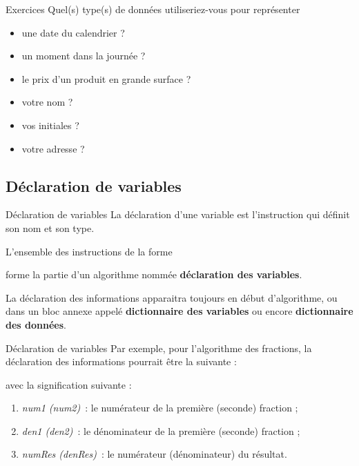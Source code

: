 \begin{frame}{Exercices}
	Quel(s) type(s) de données utiliseriez-vous 
	pour représenter 
	\begin{itemize}
		\item une date du calendrier ?
		\item un moment dans la journée ?
		\item le prix d'un produit en grande surface ?
		\item votre nom ?
		\item vos initiales ?
		\item votre adresse ?
	\end{itemize}	
\end{frame}

\subsection{Déclaration de variables}

\begin{frame}{Déclaration de variables}
	La déclaration d’une variable est l’instruction 
	qui définit son nom et son type.
	
	\bigskip
	
	L’ensemble des instructions de la forme


	forme la partie d’un algorithme nommée 
	\textbf{déclaration des variables}. 
	
	\bigskip
	
	La déclaration des informations apparaitra toujours en
	début d’algorithme, ou dans un bloc annexe appelé 
	\textbf{dictionnaire des variables} 
	ou encore \textbf{dictionnaire des données}.
\end{frame}

\begin{frame}{Déclaration de variables}
	Par exemple, pour l’algorithme des fractions, la déclaration des
	informations pourrait être la suivante :


	avec la signification suivante :

	\begin{enumerate}
	\item
		\textit{num1 (num2)}~: le numérateur 
		de la première (seconde) fraction ;
	\item
		\textit{den1 (den2)}~: le dénominateur 
		de la première (seconde) fraction ;
	\item
		\textit{numRes (denRes)}~:
		le numérateur (dénominateur) du résultat.
	\end{enumerate}
\end{frame}

